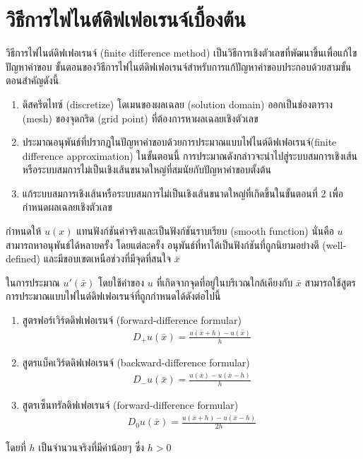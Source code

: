 \section{วิธีการไฟไนต์ดิฟเฟอเรนจ์เบื้องต้น}
\hspace{1cm} วิธีการไฟไนต์ดิฟเฟอเรนจ์ (finite difference method)  เป็นวิธีการเชิงตัวเลขที่พัฒนาขึ้นเพื่อแก้ไขปัญหาค่าขอบ ขั้นตอนของวิธีการไฟไนต์ดิฟเฟอเรนจ์สำหรับการแก้ปัญหาค่าขอบประกอบด้วยสามขั้นตอนสำคัญดังนี้

\begin{enumerate}
    \item ดิสครีตไทซ์ (discretize) โดเมนของผลเฉลย (solution domain) ออกเป็นช่องตาราง (mesh) ของจุดกริด (grid point) ที่ต้องการหาผลเฉลยเชิงตัวเลข
    \item ประมาณอนุพันธ์ที่ปรากฏในปัญหาค่าขอบด้วยการประมาณแบบไฟไนต์ดิฟเฟอเรนจ์(finite difference approximation) ในขั้นตอนนี้ การประมาณดังกล่าวจะนำไปสู่ระบบสมการเชิงเส้น หรือระบบสมการไม่เป็นเชิงเส้นขนาดใหญ่ที่สมนัยกับปัญหาค่าขอบตั้งต้น
    \item แก้ระบบสมการเชิงเส้นหรือระบบสมการไม่เป็นเชิงเส้นขนาดใหญ่ที่เกิดขึ้นในขั้นตอนที่ 2 เพื่อกำหนดผลเฉลยเชิงตัวเลข
\end{enumerate}

\hspace{1cm} กำหนดให้ $u(x)$ แทนฟังก์ชันค่าจริงและเป็นฟังก์ชันราบเรียบ (smooth function) นั่นคือ $u$ สามารถหาอนุพันธ์ได้หลายครั้ง โดยแต่ละครั้ง อนุพันธ์ที่หาได้เป็นฟังก์ชันที่ถูกนิยามอย่างดี (well-defined) และมีขอบเขตเหนือช่วงที่มีจุดที่สนใจ $\bar{x}$

\hspace{1cm} ในการประมาณ $u'(\bar{x})$ โดยใช้ค่าของ $u$ ที่เกิดจากจุดที่อยู่ในบริเวณใกล้เคียงกับ $\bar{x}$ สามารถใช้สูตรการประมาณแบบไฟไนต์ดิฟเฟอเรนจ์ที่ถูกกำหนดได้ดังต่อไปนี้
\begin{enumerate}
    \item สูตรฟอร์เวิร์ดดิฟเฟอเรนจ์ (forward-difference formular) 
    \begin{align*}
        D_{+}u(\bar{x}) = \frac{u(\bar{x}+h) - u(\bar{x})}{h}    
    \end{align*}
    \item สูตรแบ็คเวิร์ดดิฟเฟอเรนจ์ (backward-difference formular) 
    \begin{align*}
        D_{-}u(\bar{x}) = \frac{u(\bar{x}) - u(\bar{x}-h)}{h}    
    \end{align*}
    \item สูตรเซ็นทรัลดิฟเฟอเรนจ์ (forward-difference formular) 
    \begin{align*}
        D_{0}u(\bar{x}) = \frac{u(\bar{x}+h) - u(\bar{x}-h)}{2h}    
    \end{align*}
\end{enumerate}
โดยที่ $h$ เป็นจำนวนจริงที่มีค่าน้อยๆ ซึ่ง $h>0$ 

